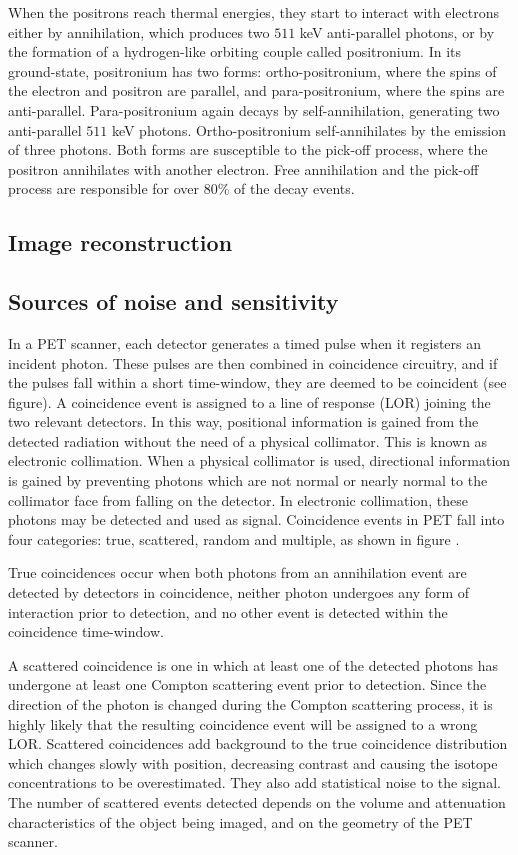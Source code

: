 When the positrons reach thermal energies, they start to interact with electrons either by annihilation, which produces two $511$ keV anti-parallel photons, or by the formation of a hydrogen-like orbiting couple called positronium. In its ground-state, positronium has two forms: ortho-positronium, where the spins of the electron and positron are parallel, and para-positronium, where the spins are anti-parallel. Para-positronium again decays by self-annihilation, generating two anti-parallel $511$ keV photons. Ortho-positronium self-annihilates by the emission of three photons. Both forms are susceptible to the pick-off process, where the positron annihilates with another electron. Free annihilation and the pick-off process are responsible for over $80\%$ of the decay events.

\subsection{Image reconstruction}

\subsection{Sources of noise and sensitivity}
In a \ac{PET} scanner, each detector generates a timed pulse when it registers an incident photon. These pulses are then combined in coincidence circuitry, and if the pulses fall within a short time-window, they are deemed to be coincident (see figure).
A coincidence event is assigned to a line of response (\ac{LOR}) joining the two relevant detectors. In this way, positional information is gained from the detected radiation without the need of a physical collimator. This is known as electronic collimation.
When a physical collimator is used, directional information is gained by preventing photons which are not normal or nearly normal to the collimator face from falling on the detector. In electronic collimation, these photons may be detected and used as signal.
Coincidence events in \ac{PET} fall into four categories: true, scattered, random and multiple, as shown in figure . 

True coincidences occur when both photons from an annihilation event are detected by detectors in coincidence, neither photon undergoes any form of interaction prior to detection, and no other event is detected within the coincidence time-window.

A scattered coincidence is one in which at least one of the detected photons has undergone at least one Compton scattering event prior to detection. Since the direction of the photon is changed during the Compton scattering process, it is highly likely that the resulting coincidence event will be assigned to a wrong \ac{LOR}. Scattered coincidences add background to the true coincidence distribution which changes slowly with position, decreasing contrast and causing the isotope concentrations to be overestimated. They also add statistical noise to the signal. The number of scattered events detected depends on the volume and attenuation characteristics of the object being imaged, and on the geometry of the \ac{PET} scanner.

